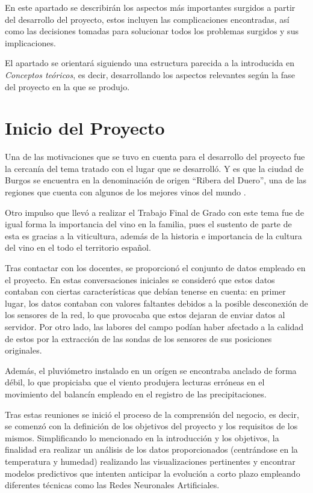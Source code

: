 
En este apartado se describirán los aspectos más importantes surgidos a partir del desarrollo del proyecto,
estos incluyen las complicaciones encontradas, así como las decisiones tomadas para solucionar todos los
problemas surgidos y sus implicaciones.

El apartado se orientará siguiendo una estructura parecida a la introducida en \textit{Conceptos teóricos}, 
es decir, desarrollando los aspectos relevantes según la fase del proyecto en la que se produjo.

\section{Inicio del Proyecto}
Una de las motivaciones que se tuvo en cuenta para el desarrollo del proyecto fue la cercanía del tema tratado
con el lugar que se desarrolló. Y es que la ciudad de Burgos se encuentra en la denominación de
origen ``Ribera del Duero'', una de las regiones que cuenta con algunos de los mejores vinos del mundo \cite{misc:abc2021}.

Otro impulso que llevó a realizar el Trabajo Final de Grado con este tema fue de igual forma la importancia 
del vino en la familia, pues el sustento de parte de esta es gracias a la viticultura, además de la historia
e importancia de la cultura del vino en el todo el territorio español.

Tras contactar con los docentes, se proporcionó el conjunto de datos empleado en el proyecto. En estas conversaciones
iniciales se consideró que estos datos contaban con ciertas características que debían tenerse en cuenta: en primer lugar,
los datos contaban con valores faltantes debidos a la posible desconexión de los sensores de la red, lo que provocaba
que estos dejaran de enviar datos al servidor. Por otro lado, las labores del campo podían haber afectado a la calidad
de estos por la extracción de las sondas de los sensores de sus posiciones originales.

Además, el pluviómetro instalado en un orígen se encontraba anclado de forma débil, lo que propiciaba que el viento 
produjera lecturas erróneas en el movimiento del balancín empleado en el registro de las precipitaciones.

Tras estas reuniones se inició el proceso de la comprensión del negocio, es decir, se comenzó con la definición de los 
objetivos del proyecto y los requisitos de los mismos. Simplificando lo mencionado en la introducción y los objetivos,
la finalidad era realizar un análisis de los datos proporcionados (centrándose en la temperatura y humedad) realizando
las visualizaciones pertinentes y encontrar modelos predictivos que intenten anticipar la evolución a corto plazo
empleando diferentes técnicas como las Redes Neuronales Artificiales.

